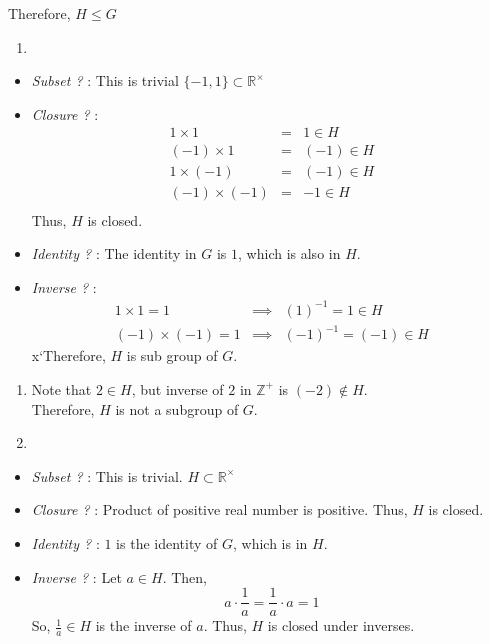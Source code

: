 \documentclass[
]{book}
\providecommand{\tightlist}{%
  \setlength{\itemsep}{0pt}\setlength{\parskip}{0pt}}
\theoremstyle{definition}
\theoremstyle{definition}
\theoremstyle{definition}
\theoremstyle{definition}
\theoremstyle{remark}
\begin{document}
Therefore, \(H \leq G\)

\begin{enumerate}
\def\labelenumi{(\alph{enumi})}
\setcounter{enumi}{1}
\tightlist
\item
\end{enumerate}

\begin{itemize}
\item
  \emph{Subset ?} : This is trivial \(\{-1,1\}\subset \mathbb{R}^\times\)
\item
  \emph{Closure ?} :
  \begin{eqnarray}
  1 \times 1 &=& 1\in H\\
  (-1) \times 1 &=& (-1)\in H\\
  1 \times (-1) &=& (-1)\in H\\
  (-1) \times (-1) &=& -1\in H\\
  \end{eqnarray}
  Thus, \(H\) is closed.
\item
  \emph{Identity ?} : The identity in \(G\) is \(1\), which is also in \(H\).
\item
  \emph{Inverse ?} :
  \begin{eqnarray}
  1 \times 1 = 1   &\implies & (1)^{-1}=1\in H\\
  (-1) \times (-1) = 1 &\implies & (-1)^{-1}=(-1)\in H
  \end{eqnarray}
  x`Therefore, \(H\) is sub group of \(G\).
\end{itemize}

\begin{enumerate}
\def\labelenumi{(\alph{enumi})}
\setcounter{enumi}{2}
\item
  Note that \(2\in H\), but inverse of \(2\) in \(\mathbb{Z}^+\) is \((-2) \not \in H\).\\
  Therefore, \(H\) is not a subgroup of \(G\).
\item
\end{enumerate}

\begin{itemize}
\item
  \emph{Subset ?} : This is trivial. \(H \subset \mathbb{R}^\times\)
\item
  \emph{Closure ?} : Product of positive real number is positive. Thus, \(H\) is closed.
\item
  \emph{Identity ?} : \(1\) is the identity of \(G\), which is in \(H\).
\item
  \emph{Inverse ?} : Let \(a\in H\). Then,
  \[a\cdot \frac{1}{a}=\frac{1}{a}\cdot a=1\]
  So, \(\frac{1}{a}\in H\) is the inverse of \(a\). Thus, \(H\) is closed under inverses.
\end{itemize}
\end{document}
